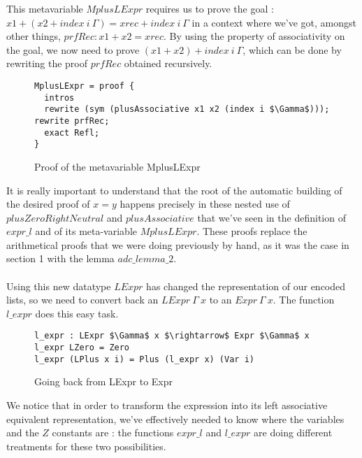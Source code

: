 This metavariable $MplusLExpr$ requires us to prove the goal : $x1 + (x2 + index\ i\ \Gamma) = xrec + index\ i\ \Gamma$ in a context where we've got, amongst other things, $prfRec : x1 + x2 = xrec$.
By using the property of associativity on the goal, we now need to prove $(x1 + x2) + index\ i\ \Gamma$, which can be done by rewriting the proof $prfRec$ obtained recursively.

\begin{figure}[H]
\figrule
\begin{center}
\begin{lstlisting}
MplusLExpr = proof {
  intros
  rewrite (sym (plusAssociative x1 x2 (index i $\Gamma$))); rewrite prfRec; 
  exact Refl;
}
\end{lstlisting}
\end{center}
\caption{Proof of the metavariable MplusLExpr}
\label{MplusExpr}
\figrule
\end{figure}

It is really important to understand that the root of the automatic building of the desired proof of $x=y$ happens precisely in these nested use of $plusZeroRightNeutral$ and $plusAssociative$ that we've seen in the definition of $expr\_l$ and of its meta-variable $MplusLExpr$. These proofs replace the arithmetical proofs that we were doing previously by hand, as it was the case in section 1 with the lemma $adc\_lemma\_2$. \\
\\
Using this new datatype $LExpr$ has changed the representation of our encoded lists, so we need to convert back an $LExpr\ \Gamma\ x$ to an $Expr\ \Gamma\ x$. The function $l\_expr$ does this easy task.
\begin{figure}[H]
\figrule
\begin{center}
\begin{lstlisting}
l_expr : LExpr $\Gamma$ x $\rightarrow$ Expr $\Gamma$ x
l_expr LZero = Zero
l_expr (LPlus x i) = Plus (l_expr x) (Var i)
\end{lstlisting}
\end{center}
\caption{Going back from LExpr to Expr}
\label{l_expr}
\figrule
\end{figure}


We notice that in order to transform the expression into its left associative equivalent representation, we've effectively needed to know where the variables and the $Z$ constants are : the functions $expr\_l$ and $l\_expr$ are doing different treatments for these two possibilities. \\
\\

